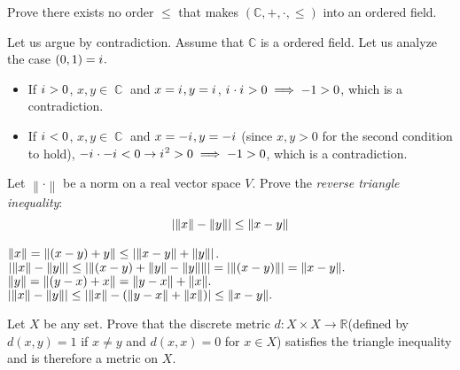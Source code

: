 \documentclass[12pt,letterpaper,boxed]{hmcpset}
\DeclarePairedDelimiter\abs{\lvert}{\rvert}
\DeclarePairedDelimiter{\norm}{\lVert}{\rVert}
\DeclareMathOperator{\C}{\mathbb{C}}
\newcommand{\iu}{{i\mkern1mu}}
\begin{document}
\begin{problem}[Exercise 6.4.]
Prove there exists no order $\leq$ that makes $(\mathbb{C},+,\cdot,\leq)$ into an ordered field.
\end{problem}

\begin{solution}
Let us argue by contradiction. Assume that $\mathbb{C}$ is a ordered field. Let us analyze the case $(0,1)= \iu.$ 

\vspace{-2mm}
\begin{itemize}
	\itemsep0em
	\item If $\iu > 0$, $x, y \in \C$ and $x = \iu, y = \iu$, $\iu \cdot\iu > 0 \implies -1 > 0$, which is a contradiction.
	\item If $\iu < 0$, $x, y \in \C$ and $x = -\iu, y = -\iu$ (since $x, y > 0$ for the second condition to hold), $-\iu \cdot - \iu < 0 \rightarrow \iu^{2} > 0 \implies -1 > 0$, which is a contradiction.
\end{itemize}
\end{solution}


\begin{problem}[Exercise 1.7.]
Let $\left\lVert \cdot \right\rVert$ be a norm on a real vector space $V$. Prove the \textit{reverse triangle inequality}: $$\abs{\left\lVert x \right\rVert - \left\lVert y \right\rVert} \leq \left\lVert x - y \right\rVert$$
\end{problem}

\begin{solution}
$\norm{x}= \norm{(x - y) + y} \leq \abs{\norm{x - y} + \norm{y}}$. $ \abs{\norm{x} - \norm{y}} \leq \abs{\norm{(x - y) + \norm{y} - \norm{y}}} = \abs{\norm{(x - y)}}=\norm{x - y}.$ \\
$\norm{y}= \norm{(y - x) + x}=\norm{y - x} + \norm{x}. $$\abs{\norm{x} - \norm{y}} \leq \abs{\norm{x} - (\norm{y - x} + \norm{x})} \leq \norm{x - y}.$

\end{solution}

\begin{problem}[Exercise 2.3.]
Let $X$ be any set. Prove that the discrete metric $d : X \times X \rightarrow \mathbb{R}$(defined by $d(x,y)=1$ if $x \neq y$ and $d(x, x) = 0$ for $x \in X$) satisfies the triangle inequality and is therefore a metric on $X$.
\end{problem}
\end{document}
